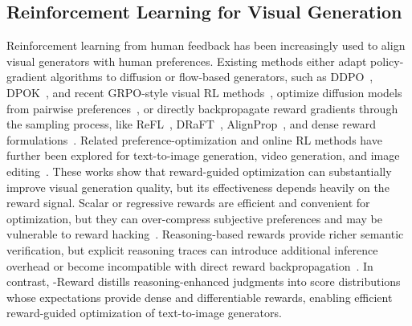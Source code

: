 \documentclass{llmxive}
\providecommand{\mname}{\twemoji[width=0.75em]{zap}-Reward\xspace}
\begin{document}
\subsection{Reinforcement Learning for Visual Generation}
Reinforcement learning from human feedback has been increasingly used to align visual generators with human preferences. Existing methods either adapt policy-gradient algorithms to diffusion or flow-based generators, such as DDPO~\cite{black2024trainingdiffusionmodelsreinforcement}, DPOK~\cite{fan2023dpok}, and recent GRPO-style visual RL methods~\cite{deepseek-math,liu2025improvingvideogenerationhuman,wu2025rewarddancerewardscalingvisual,guo2026leveraging}, optimize diffusion models from pairwise preferences~\cite{rafailov2023direct,wallace2024diffusion}, or directly backpropagate reward gradients through the sampling process, like ReFL~\cite{xu2023imagereward}, DRaFT~\cite{clark2024directlyfinetuningdiffusionmodels}, AlignProp~\cite{prabhudesai2024alignprop}, and dense reward formulations~\cite{yang2024adensereward}. Related preference-optimization and online RL methods have further been explored for text-to-image generation, video generation, and image editing~\cite{liu2025improvingvideogenerationhuman,wu2025rewarddancerewardscalingvisual,guo2026leveraging}. These works show that reward-guided optimization can substantially improve visual generation quality, but its effectiveness depends heavily on the reward signal. Scalar or regressive rewards are efficient and convenient for optimization, but they can over-compress subjective preferences and may be vulnerable to reward hacking~\cite{you2025teachinglargelanguagemodels,guo2026leveraging,gao2023scaling,rafailov2024scaling}. Reasoning-based rewards provide richer semantic verification, but explicit reasoning traces can introduce additional inference overhead or become incompatible with direct reward backpropagation~\cite{yang2026joint,guo2026leveraging}. In contrast, \mname distills reasoning-enhanced judgments into score distributions whose expectations provide dense and differentiable rewards, enabling efficient reward-guided optimization of text-to-image generators.
\end{document}
